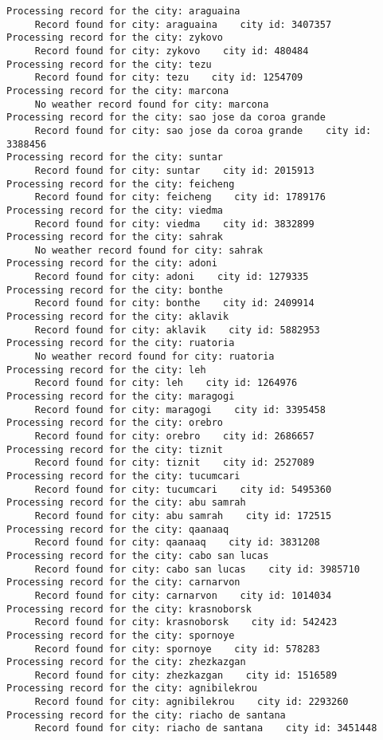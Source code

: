 \documentclass[11pt]{article}
\begin{document}
\begin{Verbatim}[commandchars=\\\{\}]
Processing record for the city: araguaina
     Record found for city: araguaina    city id: 3407357
Processing record for the city: zykovo
     Record found for city: zykovo    city id: 480484
Processing record for the city: tezu
     Record found for city: tezu    city id: 1254709
Processing record for the city: marcona
     No weather record found for city: marcona
Processing record for the city: sao jose da coroa grande
     Record found for city: sao jose da coroa grande    city id: 3388456
Processing record for the city: suntar
     Record found for city: suntar    city id: 2015913
Processing record for the city: feicheng
     Record found for city: feicheng    city id: 1789176
Processing record for the city: viedma
     Record found for city: viedma    city id: 3832899
Processing record for the city: sahrak
     No weather record found for city: sahrak
Processing record for the city: adoni
     Record found for city: adoni    city id: 1279335
Processing record for the city: bonthe
     Record found for city: bonthe    city id: 2409914
Processing record for the city: aklavik
     Record found for city: aklavik    city id: 5882953
Processing record for the city: ruatoria
     No weather record found for city: ruatoria
Processing record for the city: leh
     Record found for city: leh    city id: 1264976
Processing record for the city: maragogi
     Record found for city: maragogi    city id: 3395458
Processing record for the city: orebro
     Record found for city: orebro    city id: 2686657
Processing record for the city: tiznit
     Record found for city: tiznit    city id: 2527089
Processing record for the city: tucumcari
     Record found for city: tucumcari    city id: 5495360
Processing record for the city: abu samrah
     Record found for city: abu samrah    city id: 172515
Processing record for the city: qaanaaq
     Record found for city: qaanaaq    city id: 3831208
Processing record for the city: cabo san lucas
     Record found for city: cabo san lucas    city id: 3985710
Processing record for the city: carnarvon
     Record found for city: carnarvon    city id: 1014034
Processing record for the city: krasnoborsk
     Record found for city: krasnoborsk    city id: 542423
Processing record for the city: spornoye
     Record found for city: spornoye    city id: 578283
Processing record for the city: zhezkazgan
     Record found for city: zhezkazgan    city id: 1516589
Processing record for the city: agnibilekrou
     Record found for city: agnibilekrou    city id: 2293260
Processing record for the city: riacho de santana
     Record found for city: riacho de santana    city id: 3451448

\end{Verbatim}
\end{document}
